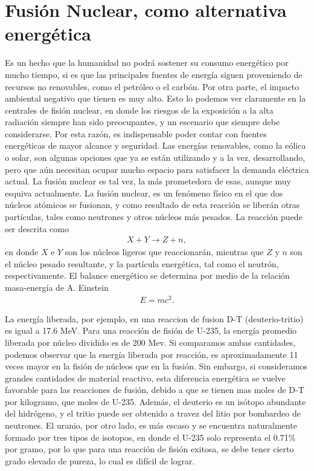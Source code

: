\documentclass[../main.tex]{subfiles}
\begin{document}
\section{Fusión Nuclear, como alternativa energética}
Es un hecho que la humanidad no podrá sostener su consumo energético por mucho tiempo, si es que las principales fuentes de energía siguen proveniendo de recursos no renovables, como el petróleo o el carbón. Por otra parte, el impacto ambiental negativo que tienen es muy alto. Esto lo podemos ver claramente en la centrales de fisión nuclear, en donde los riesgos de la exposición a la alta radiación siempre han sido preocupantes, y un escenario que siempre debe considerarse. Por esta razón, es indispensable poder contar con fuentes energéticas de mayor alcance y seguridad. Las energías renovables, como la eólica o solar, son algunas opciones que ya se están utilizando y a la vez, desarrollando, pero que aún necesitan ocupar mucho espacio para satisfacer la demanda eléctrica actual. La fusión nuclear es tal vez, la más prometedora de esas, aunque muy esquiva actualmente. La fusión nuclear, es un fenómeno físico en el que dos núcleos atómicos se fusionan, y como resultado de esta reacción se liberán otras partículas, tales como neutrones y otros núcleos más pesados. La reacción puede ser descrita como
    \begin{align}
        X + Y \rightarrow Z + n,
    \end{align}
en donde $X$ e $Y$ son los núcleos ligeros que reaccionarán, mientras que $Z$ y $n$ son el núcleo pesado resultante, y la partícula energética, tal como el neutrón, respectivamente. El balance energético se determina por medio de la relación masa-energía de A. Einstein
    \begin{align}
        E = mc^2.
    \end{align}

La energía liberada, por ejemplo, en una reaccion de fusion D-T (deuterio-tritio) es igual a 17.6 MeV. Para una reacción de fisión de U-235, la energía promedio liberada por núcleo dividido es de 200 Mev. Si comparamos ambas cantidades, podemos observar que la energía liberada
por reacción, es aproximadamente 11 veces mayor en la fisión de núcleos que en la fusión. Sin embargo, si consideramos grandes cantidades de material reactivo, esta diferencia energética se vuelve favorable para las reacciones de fusión, debido a que se tienen mas moles de D-T por kilogramo, que moles de U-235. Además, el deuterio es un isótopo abundante del hidrógeno, y el tritio puede ser obtenido a travez del litio por bombardeo de neutrones. El uranio, por otro lado, es más escaso y se encuentra naturalmente formado por tres tipos de isotopos, en donde el U-235 solo representa el 0.71\% por gramo, por lo que para una reacción de fisión exitosa, se debe tener cierto grado elevado de pureza, lo cual es difícil de lograr.\\
\end{document}
